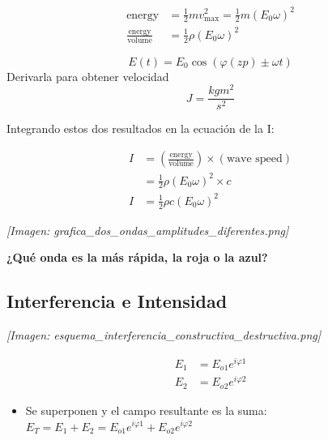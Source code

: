 \documentclass[12pt]{article}
\begin{document}
	\begin{minipage}{0.5\textwidth}
		\begin{align*}
			\text{energy} &= \frac{1}{2}mv_{\text{max}}^2 = \frac{1}{2}m(E_0\omega)^2 \\
			\frac{\text{energy}}{\text{volume}} &= \frac{1}{2}\rho(E_0\omega)^2
		\end{align*}
	\end{minipage}
	\begin{minipage}{0.4\textwidth}
		\begin{equation*}
			E(t) = E_0\cos(\varphi(zp) \pm \omega t)
		\end{equation*}
		Derivarla para obtener velocidad
		\begin{equation*}
			J = \frac{kg m^2}{s^2}
		\end{equation*}
	\end{minipage}
	
	Integrando estos dos resultados en la ecuación de la I:
	\begin{minipage}{0.5\textwidth}
		\begin{align*}
			I &= \left(\frac{\text{energy}}{\text{volume}}\right) \times (\text{wave speed}) \\
			&= \frac{1}{2}\rho(E_0\omega)^2 \times c \\
			I &= \frac{1}{2}\rho c(E_0\omega)^2
		\end{align*}
	\end{minipage}
	\begin{minipage}{0.4\textwidth}
		\textit{[Imagen: grafica\_dos\_ondas\_amplitudes\_diferentes.png]}
	\end{minipage}
	
	\vspace{0.5cm}
	\textbf{¿Qué onda es la más rápida, la roja o la azul?}
	
	\subsection{Interferencia e Intensidad}
	\begin{center}
		\textit{[Imagen: esquema\_interferencia\_constructiva\_destructiva.png]}
	\end{center}
	
	\begin{align*}
		E_1 &= E_{o1} e^{i\varphi1} \\
		E_2 &= E_{o2} e^{i\varphi2}
	\end{align*}
	
	\begin{itemize}
		\item Se superponen y el campo resultante es la suma: $E_T = E_1 + E_2 = E_{o1} e^{i\varphi1} + E_{o2} e^{i\varphi2}$
	\end{itemize}
	
\end{document}

